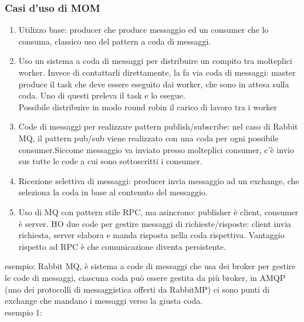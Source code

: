 \documentclass[16px]{article}
\begin{document}
\subsubsection{Casi d'uso di MOM}
\begin{enumerate}
\item Utilizzo base: producer che produce messaggio ed un consumer che lo consuma, classico uso del pattern a coda di messaggi.
\item Uso un sistema a coda di messaggi per distribuire un compito tra molteplici worker. Invece di contattarli direttamente, la fa via coda di messaggi: master produce il task che deve essere eseguito dai worker, che sono in attesa sulla coda. Uno di questi preleva il task e lo esegue.\\ Possibile distribuire in modo round robin il carico di lavoro tra i worker
\item Code di messaggi per realizzare pattern publish/subscribe: nel caso di Rabbit MQ, il pattern pub/sub viene realizzato con una coda per ogni possibile consumer.Siccome messaggio va inviato presso molteplici consumer, c'è invio sus tutte le code a cui sono sottoscritti i consumer.
\item Ricezione selettiva di messaggi: producer invia messaggio ad un exchange, che seleziona la coda in base al contenuto del messaggio.
\item Uso di MQ con pattern stile RPC, ma asincrono: publisher è client, consumer è server. HO due code per gestire messaggi di richieste/risposte: client invia richiesta, server elabora e manda risposta nella coda rispettiva. Vantaggio rispetto ad RPC è che comunicazione diventa persistente.
\end{enumerate}
esempio: Rabbit MQ, è sistema a code di messaggi che usa dei broker per gestire le code di messaggi, ciascuna coda può essere gestita da più broker, in AMQP (uno dei protocolli di messaggistica offerti da RabbitMP) ci sono punti di exchange che mandano i  messaggi verso la giusta coda.\\
esempio 1:
\end{document}
